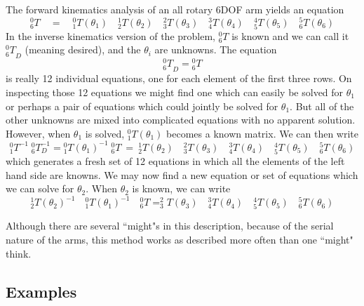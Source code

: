 The forward kinematics analysis of an all rotary  6DOF arm yields an equation
\[
^0_6T \quad = \quad ^0_1T(\theta_1) \quad ^1_2T(\theta_2) \quad ^2_3T(\theta_3) \quad ^3_4T(\theta_4) \quad ^4_5T(\theta_5) \quad ^5_6T(\theta_6)
\]
In the inverse kinematics version of the problem, ${^0_6T}$ is  known and we can call it ${^0_6T}_D$ (meaning desired), and the $\theta_i$ are unknowns.  The equation
\[
{^0_6T}_D = {^0_6T}
\]
is really 12 individual equations, one for each element of the first three rows.  On inspecting those 12 equations we might find one which can easily be solved for $\theta_1$ or perhaps a pair of equations which could jointly be solved for $\theta_1$.  But all of the other unknowns are mixed into complicated equations with no apparent solution.  However, when $\theta_1$ is solved,  $^0_1T(\theta_1)$ becomes a known matrix.  We can then write
\[
{^0_1T^{-1}}\;{^0_6T_D^{-1}} = {^0_1T(\theta_1)^{-1}}\;{^0_6T} \:
= \: {^1_2T}(\theta_2) \quad {^2_3T}(\theta_3) \quad {^3_4T}(\theta_4) \quad {^4_5T}(\theta_5) \quad {^5_6T}(\theta_6)
\]
which generates a fresh  set of 12 equations in which all the elements of the left hand side are knowns.    We may now find a new equation or set of equations which we can solve for $\theta_2$.   When $\theta_2$ is known, we can write
\[
 ^1_2T(\theta_2)^{-1} \quad {^0_1T}(\theta_1)^{-1} \quad {^0_6T}=   ^2_3T(\theta_3) \quad ^3_4T(\theta_4) \quad ^4_5T(\theta_5) \quad ^5_6T(\theta_6)
\]

Although there are several ``might"s in this description, because of the serial nature of the arms, this method works as described more often than one ``might" think.


\subsection{Examples}

